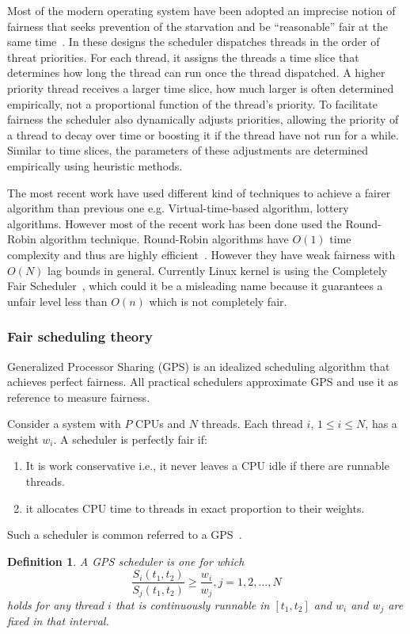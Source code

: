 \documentclass[11pt]{article}
\begin{document}
Most of the modern operating system have been adopted an imprecise notion of fairness that seeks prevention of the starvation and be ``reasonable'' fair at the same time~\cite{li09}. In these designs the scheduler dispatches threads in the order of threat priorities. For each thread, it assigns the threads a time slice that determines how long the thread can run once the thread dispatched. A higher priority thread receives a larger time slice, how much larger is often determined empirically, not a proportional function of the thread's priority. To facilitate fairness the scheduler also dynamically adjusts priorities, allowing the priority of a thread to decay over time or boosting it if the thread have not run for a while. Similar to time slices, the parameters of these adjustments are determined empirically using heuristic methods. 

The most recent work have used different kind of techniques to achieve a fairer algorithm than previous one e.g. Virtual-time-based algorithm, lottery algorithms. However most of the recent work has been done used the Round-Robin algorithm technique. Round-Robin algorithms have $O(1)$ time complexity and thus are highly efficient~\cite{li09}. However they have weak fairness with $O(N)$ lag bounds in general. Currently Linux kernel is using the Completely Fair Scheduler~\cite{jones09}, which could it be a misleading name because it guarantees a unfair level less than $O(n)$ which is not completely fair. 

\subsubsection{Fair scheduling theory}
Generalized Processor Sharing (GPS) is an idealized scheduling algorithm that achieves perfect fairness. All practical schedulers approximate GPS and use it as reference to measure fairness.

Consider a system with $P$ CPUs and $N$ threads. Each thread $i$, $1 \leq i \leq N$, has a weight $w_i$. A scheduler is perfectly fair if:
\begin{enumerate}
	\item It is work conservative i.e., it never leaves a CPU idle if there are runnable threads.
	\item it allocates CPU time to threads in exact proportion to their weights.
\end{enumerate}
Such a scheduler is common referred to a GPS~\cite{parekh93}.

\newtheorem{gps-model}{Definition}
\begin{gps-model}
A GPS scheduler is one for which
$$\frac{S_i(t_1, t_2)}{S_j(t_1, t_2)} \geq \frac{w_i}{w_j}, j=1, 2, ..., N$$
holds for any thread $i$ that is continuously runnable in $[t_1, t_2]$ and $w_i$ and $w_j$ are fixed in that interval. 
\end{gps-model}
\end{document}
